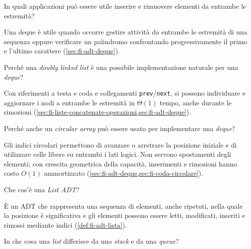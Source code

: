 \begin{exercise}
\label{ex:fi-esercizi-strutture-dati-deque-applicazioni}
In quali applicazioni può essere utile inserire e rimuovere elementi da entrambe
le estremità?
\end{exercise}

Una deque è utile quando occorre gestire attività da entrambe le estremità di
una sequenza oppure verificare un palindromo confrontando progressivamente il
primo e l'ultimo carattere (\cref{sec:fi-adt-deque}).

\begin{exercise}
\label{ex:fi-esercizi-strutture-dati-deque-doubly}
Perché una \emph{doubly linked list} è una possibile implementazione naturale
per una \emph{deque}?
\end{exercise}

Con riferimenti a testa e coda e collegamenti \texttt{prev}/\texttt{next}, si
possono individuare e aggiornare i nodi a entrambe le estremità in \(\Theta(1)\)
tempo, anche durante le rimozioni
(\cref{sec:fi-liste-concatenate-operazioni,sec:fi-adt-deque}).

\begin{exercise}
\label{ex:fi-esercizi-strutture-dati-deque-circular-array}
Perché anche un \emph{circular array} può essere usato per implementare una
\emph{deque}?
\end{exercise}

Gli indici circolari permettono di avanzare o arretrare la posizione iniziale e
di utilizzare celle libere su entrambi i lati logici. Non servono spostamenti
degli elementi; con crescita geometrica della capacità, inserimenti e rimozioni
hanno costo \(O(1)\) ammortizzato
(\cref{sec:fi-adt-deque,sec:fi-coda-circolare}).

\begin{exercise}
\label{ex:fi-esercizi-strutture-dati-list-adt-definizione}
Che cos'è una \emph{List ADT}?
\end{exercise}

È un ADT che rappresenta una sequenza di elementi, anche ripetuti, nella quale
la posizione è significativa e gli elementi possono essere letti, modificati,
inseriti e rimossi mediante indici (\cref{def:fi-adt-lista}).

\begin{exercise}
\label{ex:fi-esercizi-strutture-dati-list-vs-stack-queue}
In che cosa una \emph{list} differisce da uno \emph{stack} e da una
\emph{queue}?
\end{exercise}

